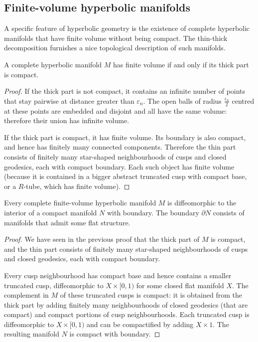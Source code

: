 \subsection{Finite-volume hyperbolic manifolds} \label{finite-volume:subsection}
A specific feature of hyperbolic geometry is the existence of complete hyperbolic manifolds that have finite volume without being compact. The thin-thick decomposition furnishes a nice topological description of such manifolds.

\begin{prop}
A complete hyperbolic manifold $M$ has finite volume if and only if its thick part is compact.
\end{prop}
\begin{proof}
If the thick part is not compact, it contains an infinite number of points that stay pairwise at distance greater than $\varepsilon_n$. The open balls of radius $\frac{\varepsilon_n}2$ centred at these points are embedded and disjoint and all have the same volume: therefore their union has infinite volume.

If the thick part is compact, it has finite volume. Its boundary is also compact, and hence has finitely many connected components. Therefore the thin part
consists of finitely many star-shaped neighbourhoods of cusps and closed geodesics, each with compact boundary. Each such object has finite volume (because it is contained in a bigger abstract truncated cusp with compact base, or a $R$-tube, which has finite volume).
\end{proof}

\begin{cor} \label{tame:cor}
Every complete finite-volume hyperbolic manifold $M$ is diffeomorphic to the interior of a compact manifold $N$ with boundary. The boundary $\partial N$ consists of manifolds that admit some flat structure.
\end{cor}
\begin{proof}
We have seen in the previous proof that the thick part of $M$ is compact, and the thin part consists of finitely many star-shaped neighbourhoods of cusps and closed geodesics, each with compact boundary.

Every cusp neighbourhood has compact base and hence contains a smaller truncated cusp, diffeomorphic to $X\times [0,1)$ for some closed flat manifold $X$. The complement in $M$ of these truncated cusps is compact: it is obtained from the thick part by adding finitely many neighbourhoods of closed geodesics (that are compact) and compact portions of cusp neighbourhoods. Each truncated cusp is diffeomorphic to $X\times [0,1)$ and can be compactified by adding $X \times 1$. The resulting manifold $N$ is compact with boundary.
\end{proof}

